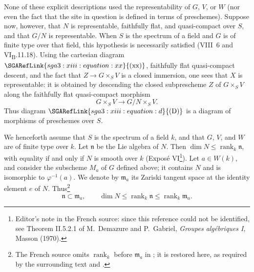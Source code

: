None of these explicit descriptions used the representability of
\(G\), \(V\), or \(W\) (nor even the fact that the site in question is
defined in terms of preschemes). Suppose now, however, that \(N\) is
representable, faithfully flat, and quasi-compact over \(S\), and that
\(G/N\) is representable. When \(S\) is the spectrum of a field and
\(G\) is of finite type over that field, this hypothesis is necessarily
satisfied (VIII~6 and VI\textsubscript{B}.11.18). Using the cartesian
diagram \(\SGARefLink{sga3:xiii:equation:xx}{\mathrm{(xx)}}\), faithfully flat quasi-compact descent, and
the fact that \(Z\to G\times_S V\) is a closed immersion, one sees that
\(X\) is representable: it is obtained by descending the closed
subprescheme \(Z\) of \(G\times_S V\) along the faithfully flat
quasi-compact morphism
\[
  G\times_S V\longrightarrow G/N\times_S V.
\]
Thus diagram \(\SGARefLink{sga3:xiii:equation:d}{\mathrm{(D)}}\) is a diagram of morphisms of
preschemes over \(S\).



We henceforth assume that \(S\) is the spectrum of a field \(k\), and
that \(G\), \(V\), and \(W\) are of finite type over \(k\). Let
\(\mathfrak n\) be the Lie algebra of \(N\). Then
\(\dim N\leq\operatorname{rank}_k\mathfrak n\), with equality if and
only if \(N\) is smooth over \(k\) (Exposé VI\footnote{Editor's note in
the French source: since this reference could not be identified, see
Theorem II.5.2.1 of M.~Demazure and P.~Gabriel,
\emph{Groupes algébriques I}, Masson (1970).}). Let \(a\in W(k)\), and
consider the subscheme \(M_a\) of \(G\) defined above; it contains
\(N\) and is isomorphic to \(\varphi^{-1}(a)\). We denote by
\(\mathfrak m_a\) its Zariski tangent space at the identity element
\(e\) of \(N\). Thus\footnote{The French source omits
\(\operatorname{rank}_k\) before \(\mathfrak m_a\) in ; it is
restored here, as required by the surrounding text and .}
\[
\tag{1}
  \mathfrak n\subset\mathfrak m_a,\qquad
  \dim N\leq\operatorname{rank}_k\mathfrak n
  \leq\operatorname{rank}_k\mathfrak m_a.
\]

